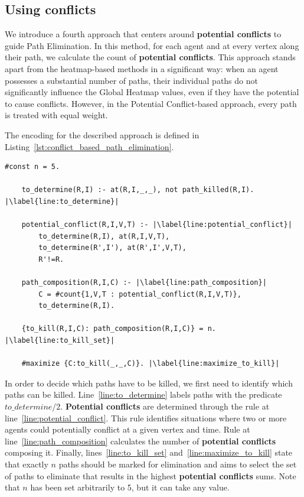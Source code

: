 \subsection{Using conflicts}

We introduce a fourth approach that centers around \textbf{potential conflicts} to guide Path Elimination. In this method, for each agent and at every vertex along their path, we calculate the count of \textbf{potential conflicts}. This approach stands apart from the heatmap-based methods in a significant way: when an agent possesses a substantial number of paths, their individual paths do not significantly influence the Global Heatmap values, even if they have the potential to cause conflicts. However, in the Potential Conflict-based approach, every path is treated with equal weight.

The encoding for the described approach is defined in Listing~\ref{lst:conflict_based_path_elimination}.


\begin{minipage}[H]{\linewidth}
\begin{lstlisting}[style=mystyle, caption={Conflict-based Path Elimination}, label={lst:conflict_based_path_elimination}]
    #const n = 5.

    to_determine(R,I) :- at(R,I,_,_), not path_killed(R,I). |\label{line:to_determine}|

    potential_conflict(R,I,V,T) :- |\label{line:potential_conflict}|
        to_determine(R,I), at(R,I,V,T), 
        to_determine(R',I'), at(R',I',V,T), 
        R'!=R.

    path_composition(R,I,C) :- |\label{line:path_composition}|
        C = #count{1,V,T : potential_conflict(R,I,V,T)}, 
        to_determine(R,I).

    {to_kill(R,I,C): path_composition(R,I,C)} = n. |\label{line:to_kill_set}|

    #maximize {C:to_kill(_,_,C)}. |\label{line:maximize_to_kill}|
\end{lstlisting}
\end{minipage}

In order to decide which paths have to be killed, we first need to identify which paths can be killed. Line~\ref{line:to_determine} labels paths with the predicate \(to\_determine/2\). \textbf{Potential conflicts} are determined through the rule at line~\ref{line:potential_conflict}. This rule identifies situations where two or more agents could potentially conflict at a given vertex and time. Rule at line~\ref{line:path_composition} calculates the number of \textbf{potential conflicts} composing it. Finally, lines~\ref{line:to_kill_set} and~\ref{line:maximize_to_kill} state that exactly \(n\) paths should be marked for elimination and aims to select the set of paths to eliminate that results in the highest \textbf{potential conflicts} sums. Note that \(n\) has been set arbitrarily to 5, but it can take any value.  

